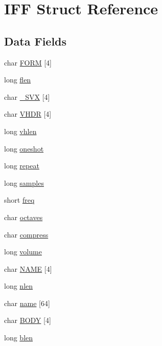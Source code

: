 \hypertarget{structIFF}{\section{I\+F\+F Struct Reference}
\label{structIFF}
}
\subsection*{Data Fields}
\begin{DoxyCompactItemize}
\item 
char \hyperlink{structIFF_a03c5d9d6498d0775ac5b5de8d32d6fc6}{F\+O\+R\+M} \mbox{[}4\mbox{]}
\item 
long \hyperlink{structIFF_adef91099995fc9f3a2d2793e72973364}{flen}
\item 
char \hyperlink{structIFF_ae2e66f43d027e5ee6b664d30e518da17}{\+\_\+S\+V\+X} \mbox{[}4\mbox{]}
\item 
char \hyperlink{structIFF_a4d304147a1dbd30fb31727571f38418b}{V\+H\+D\+R} \mbox{[}4\mbox{]}
\item 
long \hyperlink{structIFF_a2d78f63486ac3ea85cf56abad568295d}{vhlen}
\item 
long \hyperlink{structIFF_a5099f06518cae6f23aed101a7d41abeb}{oneshot}
\item 
long \hyperlink{structIFF_a3e53c273523a28fd8c3bcc3da8778bdd}{repeat}
\item 
long \hyperlink{structIFF_ac3d8e88e81739232da3592001db90724}{samples}
\item 
short \hyperlink{structIFF_a04d30d1a382ea7c06a0ca69b801318ad}{freq}
\item 
char \hyperlink{structIFF_aa6549566463bd447a6a7bf1204646d52}{octaves}
\item 
char \hyperlink{structIFF_a969e7c9fdb899c4597cb79beb7bf7b2b}{compress}
\item 
long \hyperlink{structIFF_a4dd05840f2c7166d7d5400802f7f148d}{volume}
\item 
char \hyperlink{structIFF_a34b56f8aa93d422392b6b8d18e68062c}{N\+A\+M\+E} \mbox{[}4\mbox{]}
\item 
long \hyperlink{structIFF_a857a1987197e51123f22cc81fd32b02a}{nlen}
\item 
char \hyperlink{structIFF_a822828c4ace3714efd1a34b9b3e424b8}{name} \mbox{[}64\mbox{]}
\item 
char \hyperlink{structIFF_aff26572bfbef65efe24439dfd15ecdca}{B\+O\+D\+Y} \mbox{[}4\mbox{]}
\item 
long \hyperlink{structIFF_a3fc73472318cc9e5eff0309d223d1009}{blen}
\end{DoxyCompactItemize}



